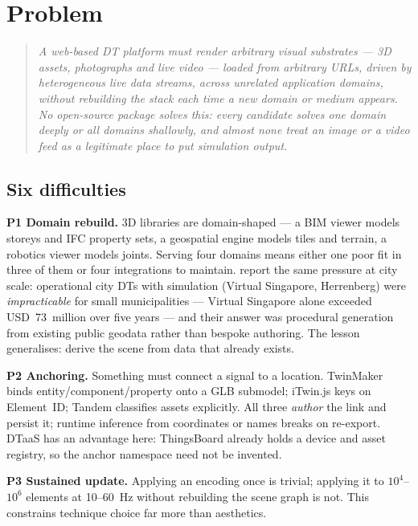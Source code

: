 \section{Problem}
\label{sec:problem}

\begin{quote}\itshape
A web-based DT platform must render arbitrary visual substrates --- 3D assets,
photographs and live video --- loaded from arbitrary URLs, driven by heterogeneous live
data streams, across unrelated application domains, without rebuilding the stack each
time a new domain or medium appears. No open-source package solves this: every candidate
solves one domain deeply or all domains shallowly, and almost none treat an image or a
video feed as a legitimate place to put simulation output.
\end{quote}

\subsection{Six difficulties}

\textbf{P1 Domain rebuild.} 3D libraries are domain-shaped --- a BIM viewer models
storeys and IFC property sets, a geospatial engine models tiles and terrain, a robotics
viewer models joints. Serving four domains means either one poor fit in three of them or
four integrations to maintain. \citet{rundel2023leveraging} report the same pressure at
city scale: operational city DTs with simulation (Virtual Singapore, Herrenberg) were
\emph{impracticable} for small municipalities --- Virtual Singapore alone exceeded
USD~73~million over five years --- and their answer was procedural generation from
existing public geodata rather than bespoke authoring. The lesson generalises: derive
the scene from data that already exists.

\textbf{P2 Anchoring.} Something must connect a signal to a location. TwinMaker binds
entity/component/property onto a GLB submodel; iTwin.js keys on Element~ID; Tandem
classifies assets explicitly. All three \emph{author} the link and persist it; runtime
inference from coordinates or names breaks on re-export. DTaaS has an advantage here:
ThingsBoard already holds a device and asset registry, so the anchor namespace need not
be invented.

\textbf{P3 Sustained update.} Applying an encoding once is trivial; applying it to
$10^4$--$10^6$ elements at 10--60~Hz without rebuilding the scene graph is not. This
constrains technique choice far more than aesthetics.

